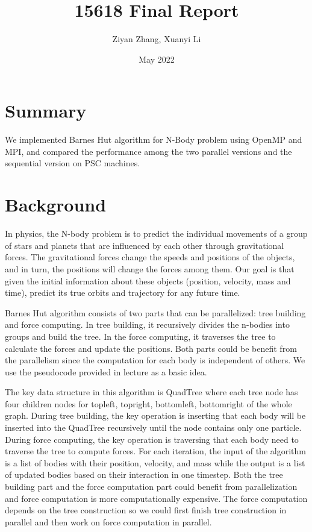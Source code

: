 \documentclass{article}
\title{15618 Final Report}
\author{Ziyan Zhang, Xuanyi Li}
\date{May 2022}
\begin{document}
\maketitle

\section{Summary}
We implemented Barnes Hut algorithm for N-Body problem using OpenMP and MPI, and compared the performance among the two parallel versions and the sequential version on PSC machines.

\section{Background}
In physics, the N-body problem is to predict the individual movements of a group of stars and planets that are influenced by each other through gravitational forces. The gravitational forces change the speeds and positions of the objects, and in turn, the positions will change the forces among them. Our goal is that given the initial information about these objects (position, velocity, mass and time), predict its true orbits and trajectory for any future time.

Barnes Hut algorithm consists of two parts that can be parallelized: tree building and force computing. In tree building, it recursively divides the n-bodies into groups and build the tree. In the force computing, it traverses the tree to calculate the forces and update the positions. Both parts could be benefit from the parallelism since the computation for each body is independent of others. We use the pseudocode provided in lecture as a basic idea.

The key data structure in this algorithm is QuadTree where each tree node has four children nodes for topleft, topright, bottomleft, bottomright of the whole graph. 
During tree building, the key operation is inserting that each body will be inserted into the QuadTree recursively until the node contains only one particle. During force computing, the key operation is traversing that each body need to traverse the tree to compute forces. For each iteration, the input of the algorithm is a list of bodies with their position, velocity, and mass while the output is a list of updated bodies based on their interaction in one timestep. Both the tree building part and the force computation part could benefit from parallelization and force computation is more computationally expensive. The force computation depends on the tree construction so we could first finish tree construction in parallel and then work on force computation in parallel.
\end{document}
